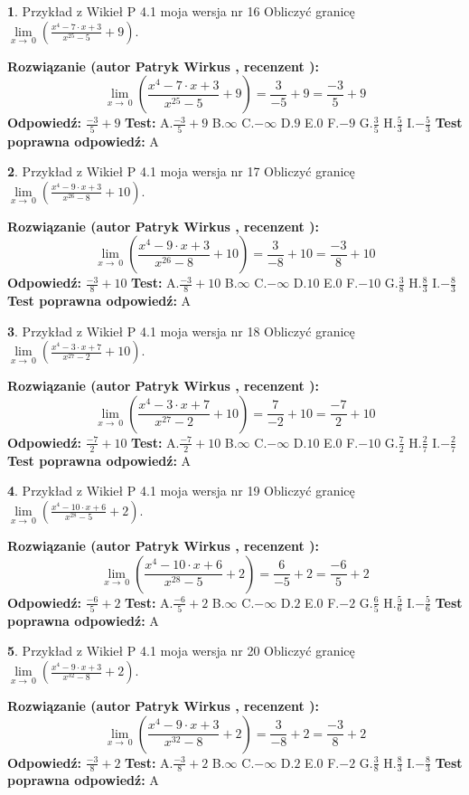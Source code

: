 \documentclass[12pt, a4paper]{article}
\theoremstyle{definition} %
\newtheorem{zad}{}
\newcommand{\zadStart}[1]{\begin{zad}#1\newline}
\newcommand{\zadStop}{\end{zad}}
\newcommand{\rozwStart}[2]{\noindent \textbf{Rozwiązanie (autor #1 , recenzent #2): }\newline}
\newcommand{\rozwStop}{\newline}
\newcommand{\odpStart}{\noindent \textbf{Odpowiedź:}\newline}
\newcommand{\odpStop}{\newline}
\newcommand{\testStart}{\noindent \textbf{Test:}\newline}
\newcommand{\testStop}{\newline}
\newcommand{\kluczStart}{\noindent \textbf{Test poprawna odpowiedź:}\newline}
\newcommand{\kluczStop}{\newline}
\begin{document}
\zadStart{Przykład z Wikieł P 4.1 moja wersja nr 16}
Obliczyć granicę $\lim\limits_{x\to\ 0}(\frac{x^{4}-7 \cdot x +3}{x^{25}-5}+9)$.
\zadStop
\rozwStart{Patryk Wirkus}{}
$$\lim\limits_{x\to\ 0}(\frac{x^{4}-7 \cdot x +3}{x^{25}-5}+9)=\frac{3}{-5}+9=\frac{-3}{5}+9$$
\rozwStop
\odpStart
$\frac{-3}{5}+9$
\odpStop
\testStart
A.$\frac{-3}{5}+9$
B.$\infty$
C.$-\infty$
D.$9$
E.$0$
F.$-9$
G.$\frac{3}{5}$
H.$\frac{5}{3}$
I.$-\frac{5}{3}$
\testStop
\kluczStart
A
\kluczStop



\zadStart{Przykład z Wikieł P 4.1 moja wersja nr 17}
Obliczyć granicę $\lim\limits_{x\to\ 0}(\frac{x^{4}-9 \cdot x +3}{x^{26}-8}+10)$.
\zadStop
\rozwStart{Patryk Wirkus}{}
$$\lim\limits_{x\to\ 0}(\frac{x^{4}-9 \cdot x +3}{x^{26}-8}+10)=\frac{3}{-8}+10=\frac{-3}{8}+10$$
\rozwStop
\odpStart
$\frac{-3}{8}+10$
\odpStop
\testStart
A.$\frac{-3}{8}+10$
B.$\infty$
C.$-\infty$
D.$10$
E.$0$
F.$-10$
G.$\frac{3}{8}$
H.$\frac{8}{3}$
I.$-\frac{8}{3}$
\testStop
\kluczStart
A
\kluczStop



\zadStart{Przykład z Wikieł P 4.1 moja wersja nr 18}
Obliczyć granicę $\lim\limits_{x\to\ 0}(\frac{x^{4}-3 \cdot x +7}{x^{27}-2}+10)$.
\zadStop
\rozwStart{Patryk Wirkus}{}
$$\lim\limits_{x\to\ 0}(\frac{x^{4}-3 \cdot x +7}{x^{27}-2}+10)=\frac{7}{-2}+10=\frac{-7}{2}+10$$
\rozwStop
\odpStart
$\frac{-7}{2}+10$
\odpStop
\testStart
A.$\frac{-7}{2}+10$
B.$\infty$
C.$-\infty$
D.$10$
E.$0$
F.$-10$
G.$\frac{7}{2}$
H.$\frac{2}{7}$
I.$-\frac{2}{7}$
\testStop
\kluczStart
A
\kluczStop



\zadStart{Przykład z Wikieł P 4.1 moja wersja nr 19}
Obliczyć granicę $\lim\limits_{x\to\ 0}(\frac{x^{4}-10 \cdot x +6}{x^{28}-5}+2)$.
\zadStop
\rozwStart{Patryk Wirkus}{}
$$\lim\limits_{x\to\ 0}(\frac{x^{4}-10 \cdot x +6}{x^{28}-5}+2)=\frac{6}{-5}+2=\frac{-6}{5}+2$$
\rozwStop
\odpStart
$\frac{-6}{5}+2$
\odpStop
\testStart
A.$\frac{-6}{5}+2$
B.$\infty$
C.$-\infty$
D.$2$
E.$0$
F.$-2$
G.$\frac{6}{5}$
H.$\frac{5}{6}$
I.$-\frac{5}{6}$
\testStop
\kluczStart
A
\kluczStop



\zadStart{Przykład z Wikieł P 4.1 moja wersja nr 20}
Obliczyć granicę $\lim\limits_{x\to\ 0}(\frac{x^{4}-9 \cdot x +3}{x^{32}-8}+2)$.
\zadStop
\rozwStart{Patryk Wirkus}{}
$$\lim\limits_{x\to\ 0}(\frac{x^{4}-9 \cdot x +3}{x^{32}-8}+2)=\frac{3}{-8}+2=\frac{-3}{8}+2$$
\rozwStop
\odpStart
$\frac{-3}{8}+2$
\odpStop
\testStart
A.$\frac{-3}{8}+2$
B.$\infty$
C.$-\infty$
D.$2$
E.$0$
F.$-2$
G.$\frac{3}{8}$
H.$\frac{8}{3}$
I.$-\frac{8}{3}$
\testStop
\kluczStart
A
\kluczStop
\end{document}
